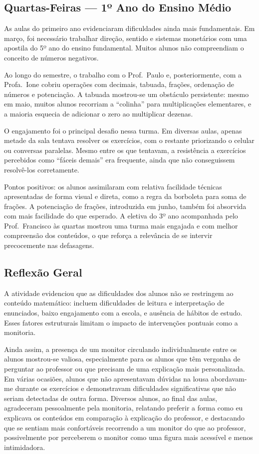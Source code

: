 \documentclass[11pt]{article}
\begin{document}
\subsection{Quartas-Feiras --- 1º Ano do Ensino Médio}

As aulas do primeiro ano evidenciaram dificuldades ainda mais fundamentais. Em março, foi necessário trabalhar direção, sentido e sistemas monetários com uma apostila do 5º ano do ensino fundamental. Muitos alunos não compreendiam o conceito de números negativos.

Ao longo do semestre, o trabalho com o Prof.\ Paulo e, posteriormente, com a Profa.\ Ione cobriu operações com decimais, tabuada, frações, ordenação de números e potenciação. A tabuada mostrou-se um obstáculo persistente: mesmo em maio, muitos alunos recorriam a ``colinha'' para multiplicações elementares, e a maioria esquecia de adicionar o zero ao multiplicar dezenas.

O engajamento foi o principal desafio nessa turma. Em diversas aulas, apenas metade da sala tentava resolver os exercícios, com o restante priorizando o celular ou conversas paralelas. Mesmo entre os que tentavam, a resistência a exercícios percebidos como ``fáceis demais'' era frequente, ainda que não conseguissem resolvê-los corretamente.

Pontos positivos: os alunos assimilaram com relativa facilidade técnicas apresentadas de forma visual e direta, como a regra da borboleta para soma de frações. A potenciação de frações, introduzida em junho, também foi absorvida com mais facilidade do que esperado. A eletiva do 3º ano acompanhada pelo Prof.\ Francisco às quartas mostrou uma turma mais engajada e com melhor compreensão dos conteúdos, o que reforça a relevância de se intervir precocemente nas defasagens.

\subsection{Reflexão Geral}

A atividade evidenciou que as dificuldades dos alunos não se restringem ao conteúdo matemático: incluem dificuldades de leitura e interpretação de enunciados, baixo engajamento com a escola, e ausência de hábitos de estudo. Esses fatores estruturais limitam o impacto de intervenções pontuais como a monitoria.

Ainda assim, a presença de um monitor circulando individualmente entre os alunos mostrou-se valiosa, especialmente para os alunos que têm vergonha de perguntar ao professor ou que precisam de uma explicação mais personalizada. Em várias ocasiões, alunos que não apresentavam dúvidas na lousa abordavam-me durante os exercícios e demonstravam dificuldades significativas que não seriam detectadas de outra forma. Diversos alunos, ao final das aulas, agradeceram pessoalmente pela monitoria, relatando preferir a forma como eu explicava os conteúdos em comparação à explicação do professor, e destacando que se sentiam mais confortáveis recorrendo a um monitor do que ao professor, possivelmente por perceberem o monitor como uma figura mais acessível e menos intimidadora.
\end{document}
